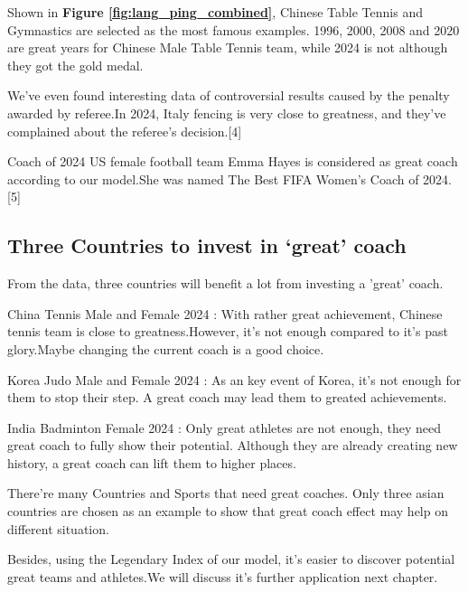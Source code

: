 Shown in \textbf{Figure \ref{fig:lang_ping_combined}}, Chinese Table Tennis and Gymnastics are selected as the most famous examples. 1996, 2000, 2008 and 2020 are great years for Chinese Male Table Tennis team, while 2024 is not although they got the gold medal.

We've even found interesting data of controversial results caused by the penalty awarded by referee.In 2024, Italy fencing is very close to greatness, and they've complained about the referee's decision.[4]

Coach of 2024 US female football team Emma Hayes is considered as great coach according to our model.She was named The Best FIFA Women's Coach of 2024.[5]

\subsection{Three Countries to invest in `great' coach}

From the data, three countries will benefit a lot from investing a 'great' coach.

China Tennis Male and Female 2024 : With rather great achievement, Chinese tennis team is close to greatness.However, it's not enough compared to it's past glory.Maybe changing the current coach is a good choice.

Korea Judo Male and Female 2024 : As an key event of Korea, it's not enough for them to stop their step. A great coach may lead them to greated achievements.

India Badminton Female 2024 : Only great athletes are not enough, they need great coach to fully show their potential. Although they are already creating new history, a great coach can lift them to higher places.

There're many Countries and Sports that need great coaches. Only three asian countries are chosen as an example to show that  great coach effect may help on different situation.

Besides, using the Legendary Index of our model, it's easier to discover potential great teams and athletes.We will discuss it's further application next chapter.
